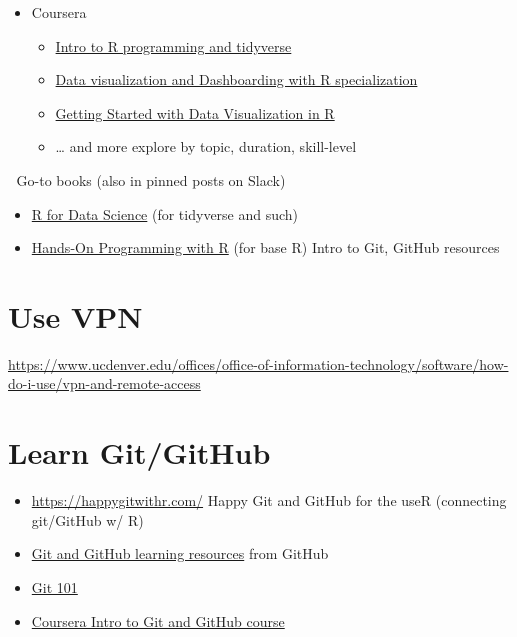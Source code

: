 \documentclass[
  letterpaper,
  DIV=11,
  numbers=noendperiod]{scrreprt}
\providecommand{\tightlist}{%
  \setlength{\itemsep}{0pt}\setlength{\parskip}{0pt}}\usepackage{longtable,booktabs,array}
\begin{document}
\begin{itemize}
\tightlist
\item
  Coursera

  \begin{itemize}
  \tightlist
  \item
    \href{https://www.coursera.org/learn/r-programming-tidyverse}{Intro
    to R programming and tidyverse}
  \item
    \href{https://www.coursera.org/specializations/jhu-data-visualization-dashboarding-with-r}{Data
    visualization and Dashboarding with R specialization}
  \item
    \href{https://www.coursera.org/learn/jhu-getting-started-data-viz-r}{Getting
    Started with Data Visualization in R}
  \item
    \ldots{} and more \textbar{} explore by topic, duration, skill-level
  \end{itemize}
\end{itemize}

📌 Go-to books (also in pinned posts on Slack)

\begin{itemize}
\tightlist
\item
  \href{https://r4ds.had.co.nz/}{R for Data Science} (for tidyverse and
  such)
\item
  \href{https://rstudio-education.github.io/hopr/}{Hands-On Programming
  with R} (for base R) Intro to Git, GitHub resources
\end{itemize}

\hypertarget{use-vpn}{%
\section{Use VPN}\label{use-vpn}}

\url{https://www.ucdenver.edu/offices/office-of-information-technology/software/how-do-i-use/vpn-and-remote-access}

\hypertarget{learn-gitgithub}{%
\section{Learn Git/GitHub}\label{learn-gitgithub}}

\begin{itemize}
\tightlist
\item
  \url{https://happygitwithr.com/} Happy Git and GitHub for the useR
  (connecting git/GitHub w/ R)
\item
  \href{https://docs.github.com/en/get-started/quickstart/git-and-github-learning-resources}{Git
  and GitHub learning resources} from GitHub
\item
  \href{https://product.hubspot.com/blog/git-and-github-tutorial-for-beginners}{Git
  101}
\item
  \href{https://www.coursera.org/learn/introduction-git-github}{Coursera
  Intro to Git and GitHub course}
\end{itemize}
\end{document}
